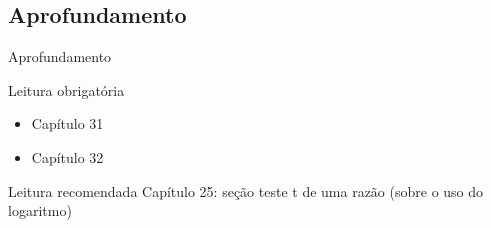 \documentclass{beamer}
\begin{document}
\subsection{Aprofundamento}

\begin{frame}{\scriptsize Aprofundamento}
  \begin{block}{Leitura obrigatória}
    \begin{itemize}
      \footnotesize
    \item Capítulo 31
    \item Capítulo 32
    \end{itemize}
  \end{block}
  \begin{block}{Leitura recomendada}
    \scriptsize
    Capítulo 25: seção teste t de uma razão ({\tiny sobre o uso do logaritmo})


  \end{block}
\end{frame}
\end{document}
